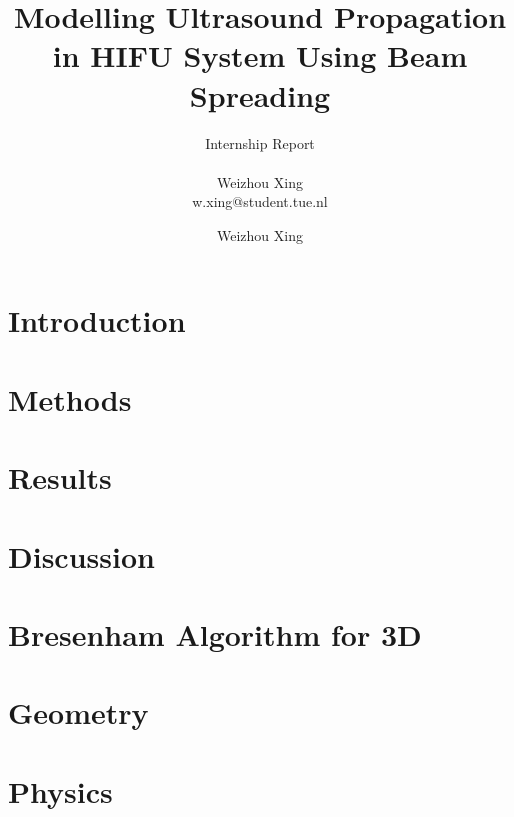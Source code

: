 \documentclass[12pt,a4paper]{report}
\title{Modelling Ultrasound Propagation in HIFU System Using Beam Spreading}
\subtitle{Internship Report \\~\\ \small{Weizhou Xing \\ \small{w.xing@student.tue.nl}}}
\author{Weizhou Xing}
\begin{document}
\maketitle
\tableofcontents



\chapter{Introduction}


\chapter{Methods}


\chapter{Results}


\chapter{Discussion}


\begin{appendices}
\chapter{Bresenham Algorithm for 3D}

\chapter{Geometry} \label{ap:geometry}

\chapter{Physics}

\end{appendices}

\printbibliography[
heading=bibintoc,
title={References}
] %

\clearpage
\end{document}
